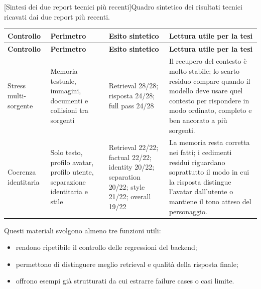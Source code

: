\par\smallskip
\footnotesize
\begingroup
{}
\hfuzz=200pt
\setlength{\tabcolsep}{2pt}
\setlength{\LTleft}{0pt}
\setlength{\LTright}{0pt}
\setlength{\LTcapwidth}{0.85\textwidth}
\captionsetup{width=0.85\textwidth,singlelinecheck=false}
\setlength{\LTleft}{\fill}
\setlength{\LTright}{\fill}
\captionsetup{type=table}
[Sintesi dei due report tecnici più recenti]{Quadro sintetico dei risultati tecnici ricavati dai due report più recenti.}
\label{tab:appendix-notes-test-summary}
\begin{longtable}{|>{\raggedright\arraybackslash}p{}|>{\raggedright\arraybackslash}p{}|>{\raggedright\arraybackslash}p{}|>{\raggedright\arraybackslash}p{}|}
\hline
\textbf{Controllo} & \textbf{Perimetro} & \textbf{Esito sintetico} & \textbf{Lettura utile per la tesi} \\
\hline
\endfirsthead
\hline
\textbf{Controllo} & \textbf{Perimetro} & \textbf{Esito sintetico} & \textbf{Lettura utile per la tesi} \\
\hline
\endhead
Stress multi-sorgente & Memoria testuale, immagini, documenti e collisioni tra sorgenti & Retrieval 28/28; risposta 24/28; full pass 24/28 & Il recupero del contesto è molto stabile; lo scarto residuo compare quando il modello deve usare quel contesto per rispondere in modo ordinato, completo e ben ancorato a più sorgenti. \\
\hline
Coerenza identitaria & Solo testo, profilo avatar, profilo utente, separazione identitaria e stile & Retrieval 22/22; factual 22/22; identity 20/22; separation 20/22; style 21/22; overall 19/22 & La memoria resta corretta nei fatti; i cedimenti residui riguardano soprattutto il modo in cui la risposta distingue l'avatar dall'utente o mantiene il tono atteso del personaggio. \\
\hline
\end{longtable}
\endgroup
\normalsize

Questi materiali svolgono almeno tre funzioni utili:
\begin{itemize}
\item rendono ripetibile il controllo delle regressioni del backend;
\item permettono di distinguere meglio retrieval e qualità della risposta finale;
\item offrono esempi già strutturati da cui estrarre failure cases o casi limite.
\end{itemize}

